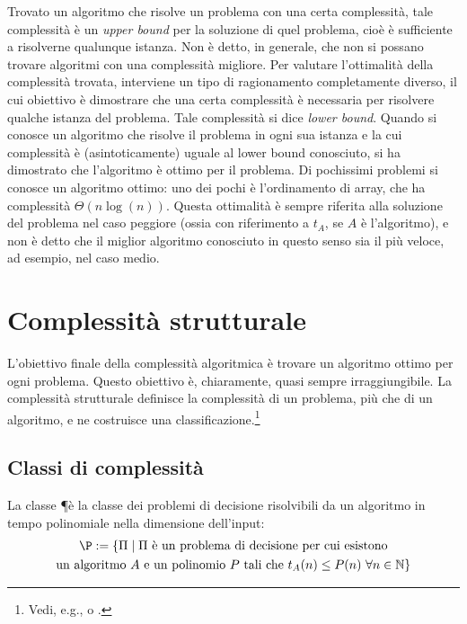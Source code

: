 Trovato un algoritmo che risolve un problema con una certa complessità, tale complessità è un \emph{upper bound} per la soluzione di quel problema, cioè è sufficiente a risolverne qualunque istanza.
Non è detto, in generale, che non si possano trovare algoritmi con una complessità migliore.
Per valutare l'ottimalità della complessità trovata, interviene un tipo di ragionamento completamente diverso, il cui obiettivo è dimostrare che una certa complessità è necessaria per risolvere qualche istanza del problema. Tale complessità si dice \emph{lower bound}.
Quando si conosce un algoritmo che risolve il problema in ogni sua istanza e la cui complessità è (asintoticamente) uguale al lower bound conosciuto, si ha dimostrato che l'algoritmo è ottimo per il problema.
Di pochissimi problemi si conosce un algoritmo ottimo: uno dei pochi è l'ordinamento di array, che ha complessità $\Theta(n\log(n))$.
Questa ottimalità è sempre riferita alla soluzione del problema nel caso peggiore (ossia con riferimento a $t_A$, se $A$ è l'algoritmo), e non è detto che il miglior algoritmo conosciuto in questo senso sia il più veloce, ad esempio, nel caso medio.



\section{Complessità strutturale}
L'obiettivo finale della complessità algoritmica è trovare un algoritmo ottimo per ogni problema.
Questo obiettivo è, chiaramente, quasi sempre irraggiungibile.
La complessità strutturale definisce la complessità di un problema, più che di un algoritmo, e ne costruisce una classificazione.\footnote{Vedi, e.g., \cite{Arora:09:computcompl} o \cite{complexityzoo}.}


\subsection{Classi di complessità}
\begin{defin}[P]
	La classe \P è la classe dei problemi di decisione risolvibili da un algoritmo in tempo polinomiale nella dimensione dell'input:
	\begin{gather*}
		\P :=\{\Pi\mid \Pi\text{ è un problema di decisione per cui esistono}\\
		\text{un algoritmo $A$ e un polinomio $P$ tali che }t_A(n)\leq P(n)~\forall n\in\N\}
	\end{gather*}
\end{defin}

